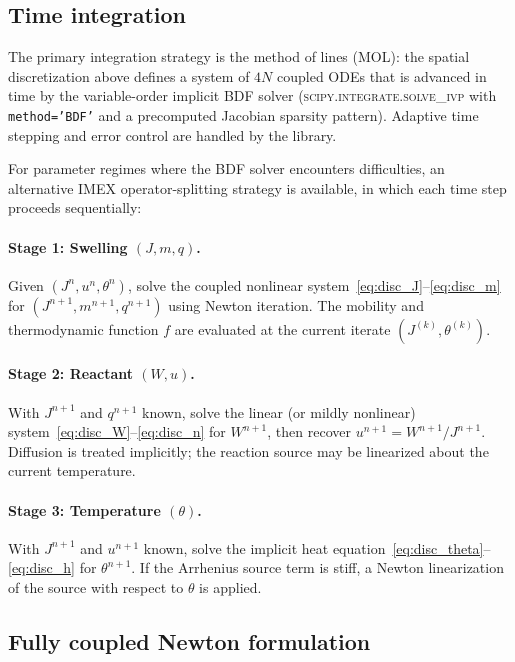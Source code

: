 \documentclass[aps,pre,reprint,superscriptaddress,longbibliography,floatfix]{revtex4-2}
\begin{document}
\subsection{Time integration}

The primary integration strategy is the method of lines (MOL): the
spatial discretization above defines a system of $4N$ coupled ODEs
that is advanced in time by the variable-order implicit BDF solver
(\textsc{scipy.integrate.solve\_ivp} with \texttt{method='BDF'} and
a precomputed Jacobian sparsity pattern).  Adaptive time stepping
and error control are handled by the library.

For parameter regimes where the BDF solver encounters difficulties,
an alternative IMEX operator-splitting strategy is available, in
which each time step proceeds sequentially:

\paragraph{Stage 1: Swelling $(J,m,q)$.}
Given $(J^n, u^n, \theta^n)$, solve the coupled nonlinear system~\eqref{eq:disc_J}--\eqref{eq:disc_m} for $(J^{n+1}, m^{n+1}, q^{n+1})$ using Newton iteration. The mobility and thermodynamic function $f$ are evaluated at the current iterate $(J^{(k)},\theta^{(k)})$.

\paragraph{Stage 2: Reactant $(W,u)$.}
With $J^{n+1}$ and $q^{n+1}$ known, solve the linear (or mildly nonlinear) system~\eqref{eq:disc_W}--\eqref{eq:disc_n} for $W^{n+1}$, then recover $u^{n+1} = W^{n+1}/J^{n+1}$. Diffusion is treated implicitly; the reaction source may be linearized about the current temperature.

\paragraph{Stage 3: Temperature $(\theta)$.}
With $J^{n+1}$ and $u^{n+1}$ known, solve the implicit heat equation~\eqref{eq:disc_theta}--\eqref{eq:disc_h} for $\theta^{n+1}$. If the Arrhenius source term is stiff, a Newton linearization of the source with respect to $\theta$ is applied.

\subsection{Fully coupled Newton formulation}
\end{document}

